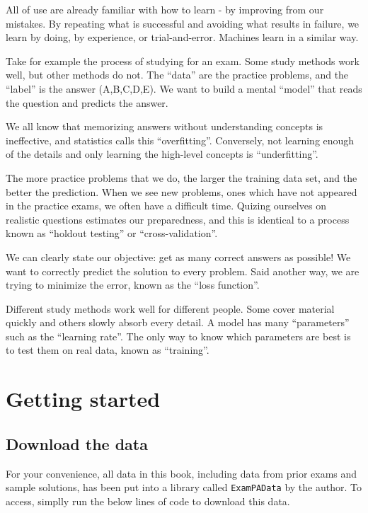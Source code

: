 \documentclass[openany]{book}
\begin{document}
All of use are already familiar with how to learn - by improving from our mistakes. By repeating what is successful and avoiding what results in failure, we learn by doing, by experience, or trial-and-error. Machines learn in a similar way.

Take for example the process of studying for an exam. Some study methods work well, but other methods do not. The ``data'' are the practice problems, and the ``label'' is the answer (A,B,C,D,E). We want to build a mental ``model'' that reads the question and predicts the answer.

We all know that memorizing answers without understanding concepts is ineffective, and statistics calls this ``overfitting''. Conversely, not learning enough of the details and only learning the high-level concepts is ``underfitting''.

The more practice problems that we do, the larger the training data set, and the better the prediction. When we see new problems, ones which have not appeared in the practice exams, we often have a difficult time. Quizing ourselves on realistic questions estimates our preparedness, and this is identical to a process known as ``holdout testing'' or ``cross-validation''.

We can clearly state our objective: get as many correct answers as possible! We want to correctly predict the solution to every problem. Said another way, we are trying to minimize the error, known as the ``loss function''.

Different study methods work well for different people. Some cover material quickly and others slowly absorb every detail. A model has many ``parameters'' such as the ``learning rate''. The only way to know which parameters are best is to test them on real data, known as ``training''.

\hypertarget{getting-started}{%
\chapter{Getting started}\label{getting-started}}

\hypertarget{download-the-data}{%
\section{Download the data}\label{download-the-data}}

For your convenience, all data in this book, including data from prior exams and sample solutions, has been put into a library called \texttt{ExamPAData} by the author. To access, simplly run the below lines of code to download this data.
\end{document}
